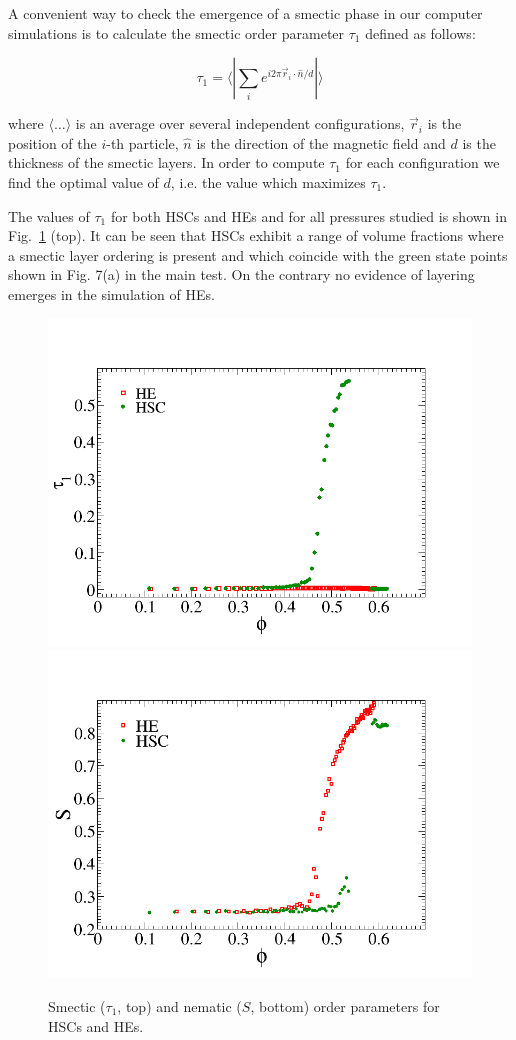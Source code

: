 \documentclass[aip,graphicx]{revtex4-1} %
\begin{document}
A convenient way to check the emergence of a smectic phase in our computer simulations 
is to calculate the smectic order parameter $\tau_1$ defined as follows:

\begin{equation}
    \tau_1 = \langle | \sum_i e^{i 2\pi \vec{r}_i \cdot \hat{n} / d } |\rangle 
\end{equation}

where $\langle\ldots\rangle$ is an average over several independent configurations, $\vec{r}_i$ is the position of the $i$-th particle, $\hat{n}$ is the direction of the magnetic
field and $d$ is the thickness of the smectic layers.
In order to compute $\tau_1$ for each configuration we find the optimal value of $d$, i.e. 
the value which maximizes $\tau_1$.

The values of $\tau_1$ for both HSCs and HEs and for all pressures studied is shown in Fig.~\ref{fig:ordpars} (top). It can be seen that HSCs exhibit a range of volume fractions where 
a smectic layer ordering is present and which coincide with the green state points shown in Fig. 7(a)
in the main test. On the contrary no evidence of layering emerges in the simulation of HEs.

\begin{figure}
    \centering
    \includegraphics[width=0.7\columnwidth]{smordpar.png}
    \includegraphics[width=0.7\columnwidth]{nemop.png}  
    \caption{Smectic ($\tau_1$, top) and nematic ($S$, bottom) order parameters for HSCs and HEs.}\label{fig:ordpars}
\end{figure}
\end{document}
